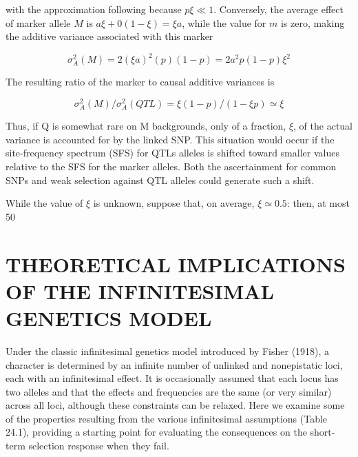 \documentclass{article}
\begin{document}
with the approximation following because  $ p\xi \ll 1 $. Conversely, the average effect of marker allele  $ M $ is  $ a\xi + 0(1 - \xi) = \xi a $, while the value for  $ m $ is zero, making the additive variance associated with this marker

\begin{equation}
\sigma_{A}^{2}(M)=2(\xi a)^{2}(p)(1-p)=2a^{2}p(1-p)\xi^{2}
\end{equation}

The resulting ratio of the marker to causal additive variances is

\begin{equation}
\sigma_{A}^{2}(M)/\sigma_{A}^{2}(Q T L)=\xi(1-p)/(1-\xi p)\simeq\xi
\end{equation}

Thus, if Q is somewhat rare on M backgrounds, only of a fraction,  $ \xi $, of the actual variance is accounted for by the linked SNP. This situation would occur if the site-frequency spectrum (SFS) for QTLs alleles is shifted toward smaller values relative to the SFS for the marker alleles. Both the ascertainment for common SNPs and weak selection against QTL alleles could generate such a shift.

While the value of  $ \xi $ is unknown, suppose that, on average,  $ \xi \simeq 0.5 $: then, at most 50%

\section{THEORETICAL IMPLICATIONS OF THE INFINITESIMAL GENETICS MODEL}
Under the classic infinitesimal genetics model introduced by Fisher (1918), a character is determined by an infinite number of unlinked and nonepistatic loci, each with an infinitesimal effect. It is occasionally assumed that each locus has two alleles and that the effects and frequencies are the same (or very similar) across all loci, although these constraints can be relaxed. Here we examine some of the properties resulting from the various infinitesimal assumptions (Table 24.1), providing a starting point for evaluating the consequences on the short-term selection response when they fail.
\end{document}
